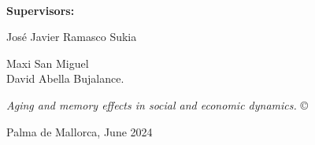\documentclass[
	11pt, %
	a4paper,
]{LegrandOrangeBook}
\begin{document}








\thispagestyle{empty} %

~\vfill %
\sffamily

\noindent \textbf{Supervisors:}

\noindent Jos\'e Javier Ramasco Sukia

\noindent Maxi San Miguel \\

\noindent David Abella Bujalance.

\noindent \textit{Aging and memory effects in social and economic dynamics.} \copyright

\noindent Palma de Mallorca, June 2024
\pagebreak


\newpage
\thispagestyle{plain} %
\mbox{}


\newpage
\thispagestyle{plain} %
\mbox{}

\newpage
\thispagestyle{plain} %
\mbox{}

\end{document}
